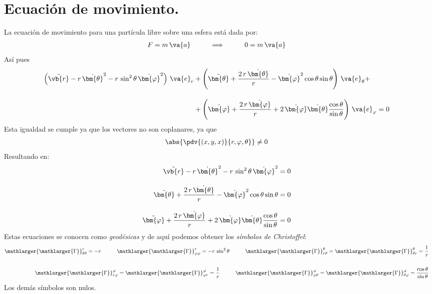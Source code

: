 \section{Ecuación de movimiento.}
La ecuación de movimiento para una partícula libre sobre una esfera está dada por:
\begin{align*}
F = m \, \va{a} \hspace{1cm} \Longrightarrow \hspace{1cm} 0 = m \, \va{a}
\end{align*}
Así pues
\begin{align*}
\left( \ddot{\vb{r}} - r \, \dot{\bm{\theta}}^{2} - r \, \sin^{2} \theta \, \dot{\bm{\varphi}}^{2} \right) \, \va{e}_{r} &+ \left( \ddot{\bm{\theta}} + \dfrac{2 \, r \, \dot{\bm{\theta}}}{r} - \dot{\bm{\varphi}}^{2} \cos \theta \sin \theta \right) \, \va{e}_{\theta} + \\[1em]
&+ \left( \ddot{\bm{\varphi}} + \dfrac{2 \, r \, \dot{\bm{\varphi}}}{r} + 2 \, \dot{\bm{\varphi}} \dot{\bm{\theta}} \dfrac{\cos \theta}{\sin \theta}  \right) \, \va{e}_{\varphi} = 0
\end{align*}
Esta igualdad se cumple ya que los vectores no son coplanares, ya que
\begin{align*}
\abs{\pdv{(x, y, x)}{r, \varphi, \theta}} \neq 0
\end{align*}
Resultando en:
\begin{align*}
\ddot{\vb{r}} - r \, \dot{\bm{\theta}}^{2} - r \, \sin^{2} \theta \, \dot{\bm{\varphi}}^{2} &= 0 \\[1em]
\ddot{\bm{\theta}} + \dfrac{2 \, r \, \dot{\bm{\theta}}}{r} - \dot{\bm{\varphi}}^{2} \cos \theta \sin \theta &= 0 \\[1em]
\ddot{\bm{\varphi}} + \dfrac{2 \, r \, \dot{\bm{\varphi}}}{r} + 2 \, \dot{\bm{\varphi}} \dot{\bm{\theta}} \dfrac{\cos \theta}{\sin \theta} &= 0
\end{align*}
Estas ecuaciones se conocen como \emph{geodésicas} y de aquí podemos obtener los \emph{símbolos de Christoffel}:
\begin{align*}
\mathlarger{\mathlarger{\Gamma}}_{\theta \theta}^{r} = - r \hspace{1cm} \mathlarger{\mathlarger{\Gamma}}_{\varphi \varphi}^{r} = - r \, \sin^{2} \theta \hspace{1cm} \mathlarger{\mathlarger{\Gamma}}_{r \theta}^{\theta} = \mathlarger{\mathlarger{\Gamma}}_{\theta r}^{\theta} = \dfrac{1}{r} \\[1.5em]
\mathlarger{\mathlarger{\Gamma}}_{r \varphi}^{\varphi} = \mathlarger{\mathlarger{\Gamma}}_{\varphi r}^{\varphi} = \dfrac{1}{r} \hspace{1cm} \mathlarger{\mathlarger{\Gamma}}_{\varphi \theta}^{\varphi} = \mathlarger{\mathlarger{\Gamma}}_{\theta \varphi}^{\varphi} = \dfrac{\cos \theta}{\sin \theta}
\end{align*}
Los demás símbolos son nulos.
